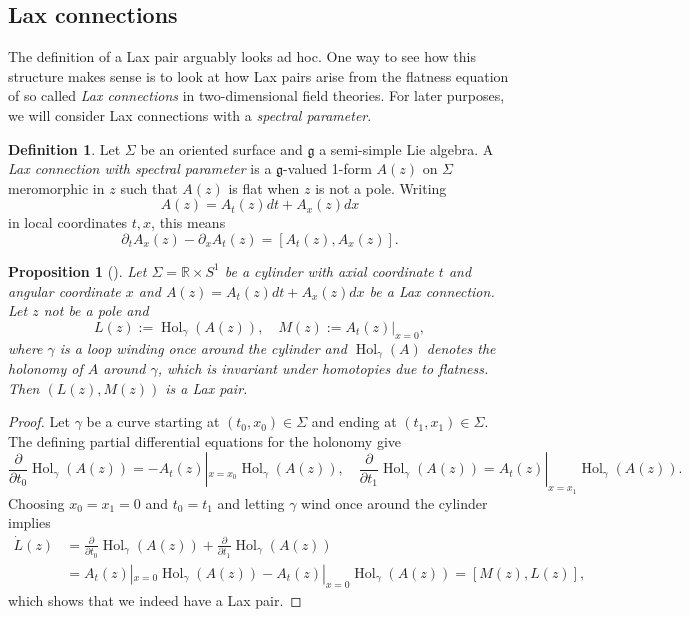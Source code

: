 \documentclass[11pt]{report}
\newtheorem{prop}[theorem]{Proposition}
\theoremstyle{definition}
\newtheorem{definition}[theorem]{Definition}
\theoremstyle{remark}
\theoremstyle{remark}
\newcommand{\R}{\mathbb{R}}
\begin{document}
\subsection{Lax connections}

The definition of a Lax pair arguably looks ad hoc. One way to see how this structure makes sense is to look at how Lax pairs arise from the flatness equation of so called \emph{Lax connections} in two-dimensional field theories. For later purposes, we will consider Lax connections with a \emph{spectral parameter}.

\begin{definition}
Let $\Sigma$ be an oriented surface and $\mathfrak{g}$ a semi-simple Lie algebra. A \emph{Lax connection with spectral parameter} is a $\mathfrak{g}$-valued 1-form $A(z)$ on $\Sigma$ meromorphic in $z$ such that $A(z)$ is flat when $z$ is not a pole. Writing
\begin{equation*}
A(z) = A_t(z) dt + A_x(z) dx
\end{equation*}
in local coordinates $t,x$, this means
\begin{equation*}
\partial_t A_x(z) - \partial_x A_t(z) = [A_t(z),A_x(z)].
\end{equation*}
\end{definition}

\begin{prop}[\cite{notes:beisert:2014}]
Let $\Sigma = \R \times S^1$ be a cylinder with axial coordinate $t$ and angular coordinate $x$ and $A(z) = A_t(z) dt + A_x(z) dx$ be a Lax connection. Let $z$ not be a pole and
\begin{equation*}
L(z) := \operatorname{Hol}_\gamma(A(z)), \quad M(z) := A_t(z)|_{x=0},
\end{equation*}
where $\gamma$ is a loop winding once around the cylinder and $\operatorname{Hol}_{\gamma}(A)$ denotes the holonomy of $A$ around $\gamma$, which is invariant under homotopies due to flatness. Then $(L(z),M(z))$ is a Lax pair.
\end{prop}

\begin{proof}
Let $\gamma$ be a curve starting at $(t_0,x_0) \in \Sigma$ and ending at $(t_1,x_1) \in \Sigma$. The defining partial differential equations for the holonomy give
\begin{equation*}
\frac{\partial}{\partial t_0} \operatorname{Hol}_\gamma(A(z)) = -A_t(z)|_{x=x_0} \operatorname{Hol}_\gamma(A(z)), \quad \frac{\partial}{\partial t_1} \operatorname{Hol}_\gamma(A(z)) = A_t(z)|_{x=x_1} \operatorname{Hol}_\gamma(A(z)).
\end{equation*}
Choosing $x_0 = x_1 = 0$ and $t_0 = t_1$ and letting $\gamma$ wind once around the cylinder implies
\begin{align*}
\dot L(z)
&= \frac{\partial}{\partial t_0} \operatorname{Hol}_\gamma(A(z)) + \frac{\partial}{\partial t_1} \operatorname{Hol}_\gamma(A(z)) \\
&= A_t(z)|_{x=0} \operatorname{Hol}_\gamma(A(z)) - A_t(z)|_{x=0} \operatorname{Hol}_\gamma(A(z)) = [M(z),L(z)],
\end{align*}
which shows that we indeed have a Lax pair.
\end{proof}
\end{document}
